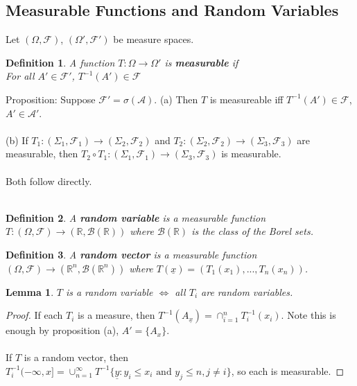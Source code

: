 \documentclass[12pt]{article}
\newtheorem{lemma}{Lemma}
\newtheorem{defn}{Definition}
\begin{document}
\subsection{Measurable Functions and Random Variables}
Let $(\Omega, \mathcal{F})$, $(\Omega', \mathcal{F}')$ be measure spaces.

\begin{defn}
A function $T: \Omega \rightarrow \Omega'$ is {\bf measurable} if\\
For all $A' \in \mathcal{F}'$, $T^{-1}(A') \in \mathcal{F}$
\end{defn}

Proposition: Suppose $\mathcal{F}' = \sigma(\mathcal{A})$.  (a) Then $T$ is measureable iff $T^{-1}(A') \in \mathcal{F}$, $A' \in \mathcal{A}'$.
\\ \\
(b) If $T_1 : (\Sigma_1, \mathcal{F}_1) \rightarrow (\Sigma_2, \mathcal{F}_2)$ and $T_2 : (\Sigma_2, \mathcal{F}_2) \rightarrow (\Sigma_3, \mathcal{F}_3)$ are measurable, then $T_2 \circ T_1 : (\Sigma_1, \mathcal{F}_1) \rightarrow (\Sigma_3, \mathcal{F}_3)$ is measurable.
\\ \\
Both follow directly.
\\ \\
\begin{defn}
A {\bf random variable} is a measurable function $T : (\Omega, \mathcal{F}) \rightarrow (\mathbb{R}, \mathcal{B}(\mathbb{R}))$ where $\mathcal{B}(\mathbb{R})$ is the class of the Borel sets.
\end{defn}
\begin{defn}
A {\bf random vector} is a measurable function $(\Omega, \mathcal{F}) \rightarrow (\mathbb{R}^n, \mathcal{B}(\mathbb{R}^n))$ where $T(\underline{x}) = (T_1(x_1), ..., T_n(x_n))$.
\end{defn}

\begin{lemma}
$T$ is a random variable $\Leftrightarrow$ all $T_i$ are random variables.
\end{lemma}
\begin{proof}
If each $T_i$ is a measure, then $T^{-1}(A_{\underline{x}}) = \cap_{i=1}^n T_i^{-1}(x_i)$.  Note this is enough by proposition (a), $A' = \{A_x\}$.
\\ \\
If $T$ is a random vector, then $T_i^{-1} (-\infty, x] = \cup_{n=1}^\infty T^{-1} \{ \underline{y} : y_i \le x_i \textrm{ and } y_j \le n, j \neq i\}$, so each is measurable.
\end{proof}
\end{document}
